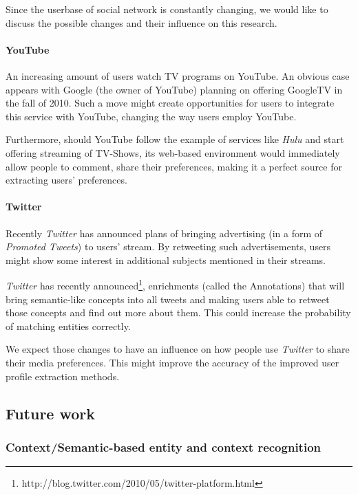 Since the userbase of social network is constantly changing, we would like to
discuss the possible changes and their influence on this research.

\paragraph{YouTube}

An increasing amount of users watch TV programs on YouTube. An obvious case
appears with Google (the owner of YouTube) planning on offering GoogleTV in the
fall of 2010. Such a move might create opportunities for users to integrate
this service with YouTube, changing the way users employ YouTube.

Furthermore, should YouTube follow the example of services like \textit{Hulu}
and start offering streaming of TV-Shows, its web-based environment would immediately
allow people to comment, share their preferences, making it a perfect source for extracting
users' preferences.

\paragraph{Twitter}

Recently \textit{Twitter} has announced plans of bringing advertising (\eg in a form of
\textit{Promoted Tweets}) to users' stream. By retweeting such advertisements,
users might show some interest in additional subjects mentioned in their
streams.

\textit{Twitter} has recently announced\footnote{http://blog.twitter.com/2010/05/twitter-platform.html},
enrichments (called the Annotations) that will bring semantic-like concepts
into all tweets and making users able to retweet those concepts and find
out more about them. This could increase the probability of matching entities correctly.

We expect those changes to have an influence on how people use \textit{Twitter}
to share their media preferences. This might improve the accuracy of the improved
user profile extraction methods.

\subsection{Future work}

\subsubsection{Context/Semantic-based entity and context recognition}


